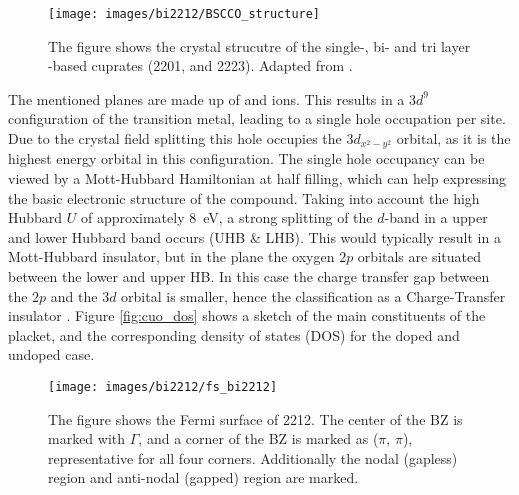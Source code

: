 \begin{figure}
	\centering
	\texttt{[image: images/bi2212/BSCCO\_structure]}
	\caption{The figure shows the crystal strucutre of the single-, bi- and tri layer -based cuprates  (2201,  and 2223). Adapted from \cite{nazargulov_english_2009}.}
	\label{fig:bscco_structure}
\end{figure}


The mentioned  planes are made up of  and  ions.
This results in a $3d^9$ configuration of the transition metal, leading to a single hole occupation per site.
Due to the crystal field splitting this hole occupies the $3d_{x^2-y^2}$ orbital, as it is the highest energy orbital in this configuration.
The single hole occupancy can be viewed by a Mott-Hubbard Hamiltonian at half filling, which can help expressing the basic electronic structure of the compound.
Taking into account the high Hubbard $U$ of approximately \qty{8}{\electronvolt}, a strong splitting of the $d$-band in a upper and lower Hubbard band occurs (UHB \& LHB).
This would typically result in a Mott-Hubbard insulator, but in the  plane the oxygen $2p$ orbitals are situated between the lower and upper HB.
In this case the charge transfer gap between the  $2p$ and the  $3d$ orbital is smaller, hence the classification as a Charge-Transfer insulator \cite{zaanen_band_1985,zegrodnik_superconductivity_2019}. 
Figure \ref{fig:cuo_dos} shows a sketch of the main constituents of the  placket, and the corresponding density of states (DOS) for the doped and undoped case.

\begin{figure}
	\centering
	\texttt{[image: images/bi2212/fs\_bi2212]}
	\caption{The figure shows the Fermi surface of 2212. The center of the BZ is marked with $\Gamma$, and a corner of the BZ is marked as ($\pi$, $\pi$), representative for all four corners. Additionally the nodal (gapless) region and anti-nodal (gapped) region are marked.}
	\label{fig:fsbi2212}
\end{figure}


